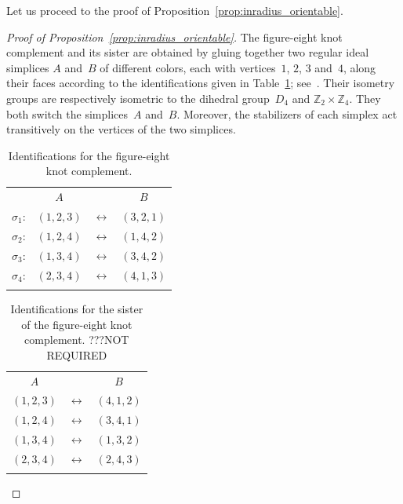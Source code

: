 \documentclass[11pt,reqno]{amsart}
\theoremstyle{definition}
\numberwithin{equation}{section}
\newcommand\Z {{\mathbb Z}}
\numberwithin{equation}{section}
\begin{document}
Let us proceed to the proof of Proposition~\ref{prop:inradius_orientable}.

\begin{proof}[Proof of Proposition~\ref{prop:inradius_orientable}]
The figure-eight knot complement and its sister are obtained by gluing together two regular ideal simplices $A$ and~$B$ of different colors, each with vertices~$1$, $2$, $3$ and~$4$, along their faces according to the identifications given in Table~\ref{table:8}; see~\cite{KRR}. 
Their isometry groups are respectively isometric to the dihedral group~$D_4$ and $\Z_2 \times \Z_4$.
They both switch the simplices~$A$ and~$B$.
Moreover, the stabilizers of each simplex act transitively on the vertices of the two simplices.

\forget

\begin{table}[hbp]
\centering
\begin{tabular}{rccc} 
 & $A$ & & $B$ \\
$\sigma_1$: & $(1,2,3)$ & $\leftrightarrow$ & $(3,2,1)$ \\
$\sigma_2$: & $(1,2,4)$ & $\leftrightarrow$ & $(1,4,2)$ \\
$\sigma_3$: & $(1,3,4)$ & $\leftrightarrow$ & $(3,4,2)$ \\
$\sigma_4$: & $(2,3,4)$ & $\leftrightarrow$ & $(4,1,3)$ \\
 & & & 
\end{tabular}
\caption{Identifications for the figure-eight knot complement.} \label{table:8}
\end{table}



\begin{table}[hbp]
\centering
\begin{tabular}{ccc} 
$A$ & & $B$ \\
$(1,2,3)$ & $\leftrightarrow$ & $(4,1,2)$ \\
$(1,2,4)$ & $\leftrightarrow$ & $(3,4,1)$ \\
$(1,3,4)$ & $\leftrightarrow$ & $(1,3,2)$ \\
$(2,3,4)$ & $\leftrightarrow$ & $(2,4,3)$ \\
& &
\end{tabular}
\caption{Identifications for the sister of the figure-eight knot complement. ???NOT REQUIRED} \label{table:sister}
\end{table}

\forgotten





\end{proof}
\end{document}
